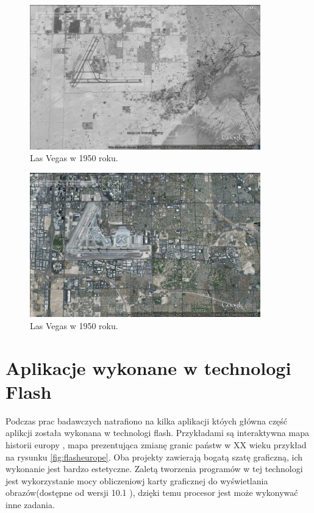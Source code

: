 \begin{figure}[H]
  \centering
    \includegraphics[width=100mm]{ge/02_1977.jpg}
  \caption{Las Vegas w 1950 roku.}
  \label{fig:lasVegas2}
\end{figure}

\begin{figure}[H]
  \centering
    \includegraphics[width=100mm]{ge/03_2012.jpg}
  \caption{Las Vegas w 1950 roku.}
  \label{fig:lasVegas3}
\end{figure}

\section{Aplikacje wykonane w technologi Flash}
\label{sec:flashmap}

Podczas prac badawczych natrafiono na kilka aplikacji któych główna część aplikcji została wykonana w technologi flash. Przykładami są interaktywna mapa historii europy \cite{worldology}, mapa prezentująca zmianę granic państw w XX wieku \cite{flashborder} przykład na rysunku \ref{fig:flasheurope}. Oba projekty zawierają bogatą szatę graficzną, ich wykonanie jest bardzo estetyczne.
Zaletą tworzenia programów w tej technologi jest wykorzystanie mocy obliczeniowj karty graficznej do wyświetlania obrazów(dostępne od wersji 10.1 \cite{flashfrapghic}), dzięki temu procesor jest może wykonywać inne zadania.

